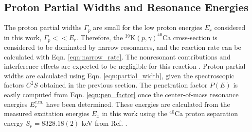 \begin{table}[!tp]
\begin{minipage}{\textwidth}
{\begin{tabular}{cllllllll}
\hline\hline
\end{tabular}%
}
\vspace{-0.2cm}
\end{minipage}
\end{table}
\endgroup

\subsection{Proton Partial Widths and Resonance Energies} \label{subsec:partial_widths}

The proton partial widths $\Gamma_{p}$ are small for the low proton energies $E_{r}$ considered in this work, $\Gamma_{p} << E_{r}$. Therefore, the $^{39}\mathrm{K}(p,\gamma)^{40}\mathrm{Ca}$ cross-section is considered to be dominated by narrow resonances, and the reaction rate can be calculated with Eqn. \ref{eqn:narrow_rate}. The nonresonant contributions and interference effects are expected to be negligible for this reaction \cite{Longland2018}. Proton partial widths are calculated using Eqn. \ref{eqn:partial_width}, given the spectroscopic factors $C^{2}S$ obtained in the previous section. The penetration factor $P(E)$ is easily computed from Eqn. \ref{eqn:pen_factor} once the center-of-mass resonance energies $E^{\mathrm{c.m.}}_{r}$ have been determined. These energies are calculated from the measured excitation energies $E_{x}$ in this work using the $^{40}$Ca proton separation energy $S_{p} = 8328.18(2)$ keV from Ref. \cite{Wang2021}. 

